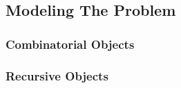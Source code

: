 \subsection{Modeling The Problem}

\subsubsection{Combinatorial Objects}

\subsubsection{Recursive Objects}